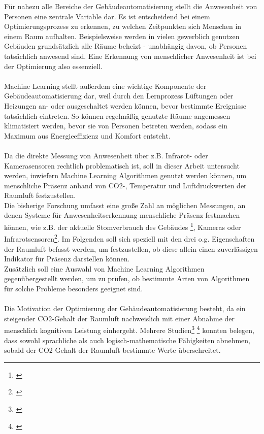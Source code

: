 Für nahezu alle Bereiche der Gebäudeautomatisierung stellt die Anwesenheit 
von Personen eine zentrale Variable dar. Es ist entscheidend bei einem Optimierungsprozess zu erkennen, zu
welchen Zeitpunkten sich Menschen in einem Raum aufhalten. Beispielsweise werden in vielen gewerblich 
genutzen Gebäuden grundsätzlich alle Räume beheizt - unabhängig davon, ob Personen tatsächlich anwesend sind. 
Eine Erkennung von menschlicher Anwesenheit ist bei der Optimierung also essenziell.\\\\
Machine Learning stellt außerdem eine wichtige Komponente der Gebäudeautomatisierung dar, weil durch den
Lernprozess Lüftungen oder Heizungen an- oder ausgeschaltet werden können, bevor bestimmte Ereignisse 
tatsächlich eintreten. So können regelmäßig genutzte Räume angemessen klimatisiert werden, bevor sie von 
Personen betreten werden, sodass ein Maximum aus Energieeffizienz und Komfort entsteht.\\\\
Da die direkte Messung von Anwesenheit über z.B. Infrarot- oder Kamerasensoren rechtlich problematisch ist, 
soll in dieser Arbeit untersucht werden, inwiefern Machine Learning Algorithmen genutzt werden können, 
um menschliche Präsenz anhand von CO2-, Temperatur und Luftdruckwerten der Raumluft festzustellen.\\
Die bisherige Forschung umfasst eine große Zahl an möglichen Messungen, an denen Systeme für 
Anwesenheitserkennung menschliche Präsenz festmachen können, wie z.B. der aktuelle Stomverbrauch 
des Gebäudes \footnote[1]{\cite{Kleiminger}}, Kameras oder Infrarotsensoren\footnote[2]{\cite{Krieger}}. 
Im Folgenden soll sich speziell mit den drei o.g. Eigenschaften der 
Raumluft befasst werden, um festzustellen, ob diese allein einen zuverlässigen Indikator für Präsenz 
darstellen können.\\
Zusätzlich soll eine Auswahl von Machine Learning Algorithmen gegenübergestellt werden, um zu prüfen, ob
bestimmte Arten von Algorithmen für solche Probleme besonders geeignet sind.\\\\
Die Motivation der Optimierung der Gebäudeautomatisierung besteht, da ein steigender CO2-Gehalt der 
Raumluft nachweislich mit einer Abnahme der menschlich kognitiven Leistung einhergeht. 
Mehrere Studien\footnote[3]{\cite{SNOW}} \footnote[4]{\cite{RIHAMJABER}} konnten belegen, dass 
sowohl sprachliche als auch logisch-mathematische Fähigkeiten abnehmen, sobald 
der CO2-Gehalt der Raumluft bestimmte Werte überschreitet.\\ 
